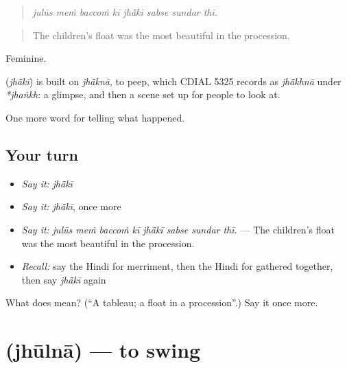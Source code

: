 \begin{quote}
\emph{julūs meṁ baccoṁ kī jhā̃kī sabse sundar thī.}
\end{quote}

\begin{quote}
The children's float was the most beautiful in the procession.
\end{quote}

Feminine.

\begin{cousinweb}
\textbf{} (\emph{jhā̃kī}) is built on \emph{jhā̃knā}, to peep, which CDIAL 5325 records as \emph{jhā̃khnā} under \emph{*jhaṅkh}: a glimpse, and then a scene set up for people to look at.
\end{cousinweb}

\begin{grammarlens}[title={What you've built}]
One more word for telling what happened.
\end{grammarlens}

\subsection*{Your turn}
\begin{itemize}
\raggedright
  \item \emph{Say it:} \emph{jhā̃kī}
  \item \emph{Say it:} \emph{jhā̃kī}, once more
  \item \emph{Say it:} \emph{julūs meṁ baccoṁ kī jhā̃kī sabse sundar thī.} — The children's float was the most beautiful in the procession.
  \item \emph{Recall:} say the Hindi for merriment, then the Hindi for gathered together, then say \emph{jhā̃kī} again
\end{itemize}

\begin{tcolorbox}[breakable,colback=teal!4,colframe=teal!35!black,title={Before you move on}]
What does  mean? (\textquotedblleft{}A tableau; a float in a procession\textquotedblright{}.) Say it once more.
\end{tcolorbox}
\section[\texorpdfstring{\hi{झूलना} (jhūlnā)}{झूलना (jhūlnā)}]{ (jhūlnā) — to swing}

\label{lesson:HI-C330-jhulna}



